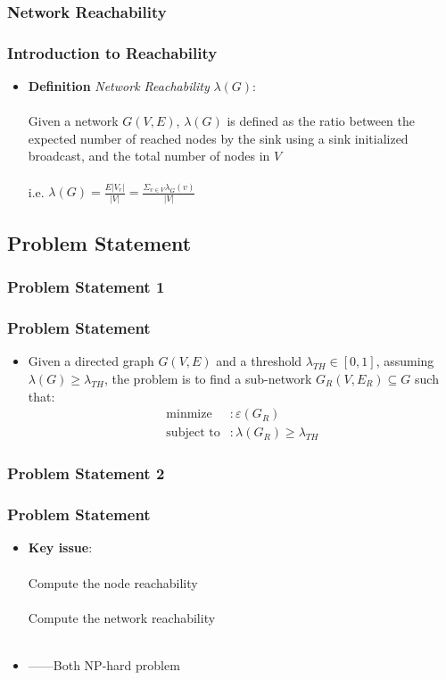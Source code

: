 \documentclass[xcolor=dvipsnames]{beamer}
\begin{document}
\subsubsection{Network Reachability}
\begin{frame}
\frametitle{Introduction to Reachability}
\begin{itemize}
\item \textbf{Definition} \textit{Network Reachability} $\lambda(G)$:\\
\indent\\
Given a network $G(V,E)$, $\lambda(G)$ is defined as the ratio between the expected
number of reached nodes by the sink using a sink initialized
broadcast, and the total number of nodes in $V$ \\
\indent\\
i.e.  $\lambda(G)=\frac{E|V_{r}|}{|V|}=\frac{\Sigma_{v\in V} \lambda_{G}(v)}{|V|}$
\end{itemize}
\end{frame}

\subsection{Problem Statement}
\subsubsection{Problem Statement 1}
\begin{frame}
\frametitle{Problem Statement}
\begin{itemize}
\item Given a directed graph $G(V,E)$ and a threshold $\lambda_{TH}\in[0,1]$, assuming $\lambda(G)\geq \lambda_{TH}$, the problem is to find a sub-network $G_{R}(V,E_{R}) \subseteq G$ such that:
\begin{align*}
\textrm{minmize} &: \varepsilon(G_{R})\\
\textrm{subject to} &: \lambda(G_{R})\geq \lambda_{TH}
\end{align*}
\end{itemize}
\end{frame}

\subsubsection{Problem Statement 2}
\begin{frame}
\frametitle{Problem Statement}
\begin{itemize}
\item
\textbf{Key issue}:\\
\indent\\
\indent Compute the node reachability\\
\indent\\
\indent Compute the network reachability\\
\indent\\
\item
\begin{flushright}
------Both NP-hard problem
\end{flushright}
\end{itemize}
\end{frame}
\end{document}
